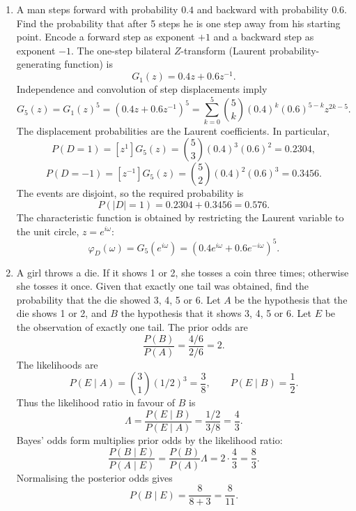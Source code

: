 \begin{enumerate}[leftmargin=4mm,itemsep=9pt]
\[\[\[\[The incremental gains on the open pieces are
\[
f'_-(x)=2-2x\in(2,4),\qquad f'_+(x)=2x\in(0,2).
\]
At the switching point, the one-sided derivatives are $f'_-(0)=2$ and $f'_+(0)=0$, so the characteristic is continuous but not classically differentiable at 0. The derivative magnitude is bounded by 4 throughout the interval, hence the characteristic is globally Lipschitz with sharp constant $L=4$:
\[
|f(x)-f(y)|\le4|x-y|,\qquad x,y\in[-1,1].
\]
The range is $[-3,1]$, so the response is bounded. There is no discontinuity, but there is a corner at the switching point.

\item A man steps forward with probability $0.4$ and backward with probability $0.6$. Find the probability that after 5 steps he is one step away from his starting point.
\solution Encode a forward step as exponent $+1$ and a backward step as exponent $-1$. The one-step bilateral $Z$-transform (Laurent probability-generating function) is
\[
G_1(z)=0.4z+0.6z^{-1}.
\]
Independence and convolution of step displacements imply
\[
G_5(z)=G_1(z)^5
=(0.4z+0.6z^{-1})^5
=\sum_{k=0}^5\binom5k(0.4)^k(0.6)^{5-k}z^{2k-5}.
\]
The displacement probabilities are the Laurent coefficients. In particular,
\[
P(D=1)=[z^1]G_5(z)=\binom53(0.4)^3(0.6)^2=0.2304,
\]
\[
P(D=-1)=[z^{-1}]G_5(z)=\binom52(0.4)^2(0.6)^3=0.3456.
\]
The events are disjoint, so the required probability is
\[
\boxed{P(|D|=1)=0.2304+0.3456=0.576}.
\]
The characteristic function is obtained by restricting the Laurent variable to the unit circle, $z=e^{i\omega}$:
\[
\varphi_D(\omega)=G_5(e^{i\omega})
=(0.4e^{i\omega}+0.6e^{-i\omega})^5.
\]

\item A girl throws a die. If it shows 1 or 2, she tosses a coin three times; otherwise she tosses it once. Given that exactly one tail was obtained, find the probability that the die showed 3, 4, 5 or 6.
\solution Let $A$ be the hypothesis that the die shows 1 or 2, and $B$ the hypothesis that it shows 3, 4, 5 or 6. Let $E$ be the observation of exactly one tail. The prior odds are
\[
\frac{P(B)}{P(A)}=\frac{4/6}{2/6}=2.
\]
The likelihoods are
\[
P(E\mid A)=\binom31(1/2)^3=\frac38,\qquad
P(E\mid B)=\frac12.
\]
Thus the likelihood ratio in favour of $B$ is
\[
\Lambda=\frac{P(E\mid B)}{P(E\mid A)}
=\frac{1/2}{3/8}=\frac43.
\]
Bayes' odds form multiplies prior odds by the likelihood ratio:
\[
\frac{P(B\mid E)}{P(A\mid E)}
=\frac{P(B)}{P(A)}\Lambda
=2\cdot\frac43=\frac83.
\]
Normalising the posterior odds gives
\[
\boxed{P(B\mid E)=\frac{8}{8+3}=\frac8{11}}.

\]\]\]\]\]
\end{enumerate}
